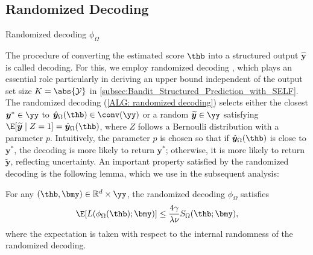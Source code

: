 \subsection{Randomized Decoding}\label{subsec:randomized_decoding}
\begin{algorithm}[t]
    \caption{Randomized decoding $\phi_\Omega$}
    \label{ALG: randomized decoding}
    \begin{algorithmic}[1]
            \Ensure{$\phi_\Omega(\thb)=\yh$}
    \end{algorithmic}
\end{algorithm}


The procedure of converting the estimated score $\thb$ into a structured output $\bm{\hat{y}}$ is called decoding.  
For this, we employ randomized decoding \citep{pmlr-v247-sakaue24a},  
which plays an essential role particularly in deriving an upper bound independent of the output set size $K = \abs{\mathcal{Y}}$ in \cref{subsec:Bandit_Structured_Prediction_with_SELF}.
The randomized decoding (\cref{ALG: randomized decoding}) selects either the closest $\bm{y}^* \in \yy$ to $\hat{\bm{y}}_\Omega(\thb) \in \conv(\yy)$ or a random $\widetilde{\bm{y}} \in \yy$ satisfying $\E[\widetilde{\bm{y}} \mid Z=1] = \hat{\bm{y}}_\Omega(\thb)$, where $Z$ follows a Bernoulli distribution with a parameter $p$.  
Intuitively, the parameter $p$ is chosen so that if $\hat{\bm{y}}_\Omega(\thb)$ is close to $\bm{y}^*$, the decoding is more likely to return $\bm{y}^*$; otherwise, it is more likely to return $\widetilde{\bm{y}}$, reflecting uncertainty.  
An important property satisfied by the randomized decoding is the following lemma, which we use in the subsequent analysis:
\begin{lemma}
    \label{lem:expected_target_bound}
  For any $(\thb, \bmy) \in \mathbb{R}^d\times\yy$, the randomized decoding $\phi_\Omega$ satisfies
  \[
    \E[L(\phi_\Omega(\thb);\bmy)] \leq \frac{4\gamma}{\lambda\nu} S_\Omega(\thb;\bmy),
  \]
  where the expectation is taken with respect to the internal randomness of the randomized decoding.
\end{lemma}








